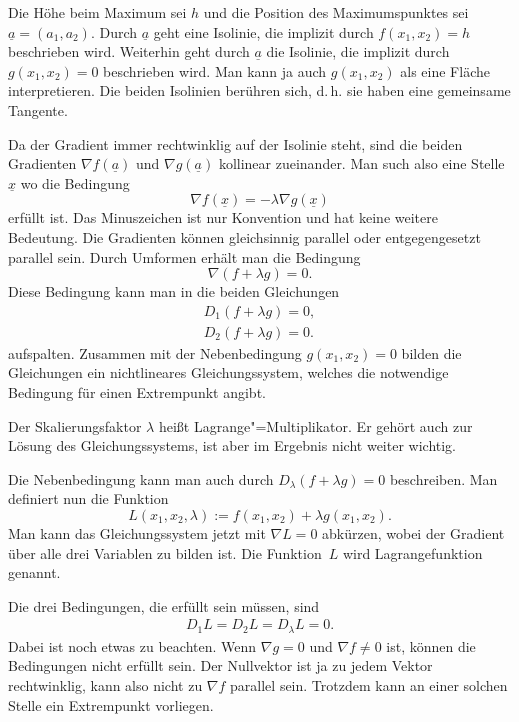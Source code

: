 \documentclass[a4paper,10pt,fleqn,twocolumn,twoside]{article}
\numberwithin{equation}{section}
\begin{document}
Die Höhe beim Maximum sei $h$ und die Position des Maximumspunktes
sei $\underline a = (a_1,a_2)$. Durch $\underline a$ geht eine
Isolinie, die implizit durch $f(x_1,x_2)=h$ beschrieben wird.
Weiterhin geht durch $\underline a$ die
Isolinie, die implizit durch $g(x_1,x_2)=0$ beschrieben wird.
Man kann ja auch $g(x_1,x_2)$ als eine Fläche interpretieren.
Die beiden Isolinien berühren sich, d.\,h. sie
haben eine gemeinsame Tangente.

Da der Gradient immer rechtwinklig auf der Isolinie steht, sind die
beiden Gradienten $\nabla f(\underline a)$ und
$\nabla g(\underline a)$ kollinear zueinander. Man such also eine
Stelle $\underline x$ wo die Bedingung
\begin{equation}
\nabla f(\underline x) = -\lambda\nabla g(\underline x)
\end{equation}
erfüllt ist. Das Minuszeichen ist nur Konvention und hat keine weitere
Bedeutung. Die Gradienten können
gleichsinnig parallel oder entgegengesetzt parallel sein.
Durch Umformen erhält man die Bedingung
\begin{equation}
\nabla (f+\lambda g)=0.
\end{equation}
Diese Bedingung kann man in die beiden Gleichungen
\begin{gather*}
D_1(f+\lambda g)=0,\\
D_2(f+\lambda g)=0.
\end{gather*}
aufspalten. Zusammen mit der Nebenbedingung $g(x_1,x_2)=0$ bilden
die Gleichungen ein nichtlineares Gleichungssystem, welches die
notwendige Bedingung für einen Extrempunkt angibt.

Der Skalierungsfaktor $\lambda$ heißt Lagrange"=Multiplikator.
Er gehört auch zur Lösung des Gleichungssystems, ist aber
im Ergebnis nicht weiter wichtig.

Die Nebenbedingung kann man auch durch
$D_\lambda (f+\lambda g)=0$ beschreiben.
Man definiert nun die Funktion
\begin{equation}
L(x_1,x_2,\lambda) := f(x_1,x_2)+\lambda g(x_1,x_2).
\end{equation}
Man kann das Gleichungssystem jetzt mit $\nabla L=0$
abkürzen, wobei der Gradient über alle drei Variablen zu bilden ist.
Die Funktion~$L$ wird Lagrangefunktion genannt.

Die drei Bedingungen, die erfüllt sein müssen, sind
\begin{gather*}
D_1 L = D_2 L = D_\lambda L = 0.
\end{gather*}
Dabei ist noch etwas zu beachten. Wenn $\nabla g=0$ und
$\nabla f\ne 0$ ist, können die Bedingungen
nicht erfüllt sein. Der Nullvektor ist ja zu jedem Vektor
rechtwinklig, kann also nicht zu $\nabla f$ parallel sein.
Trotzdem kann an einer solchen Stelle ein Extrempunkt vorliegen.
\end{document}
